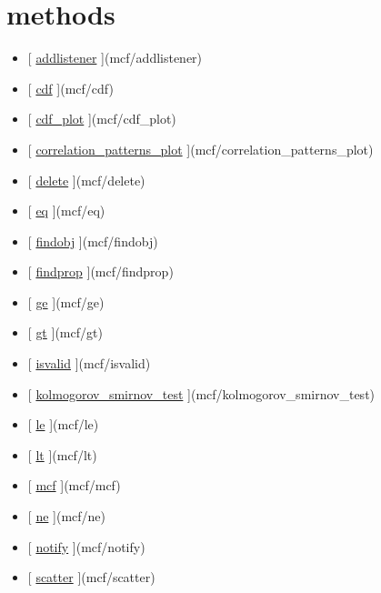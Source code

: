 \documentclass[letterpaper,10pt,english]{sphinxmanual}
\begin{document}
\section{methods}
\label{classes/utils/@mcf/mcf:methods}\begin{itemize}
\item {} 
{[} {\hyperref[classes/utils/@mcf/mcf:addlistener]{addlistener}} {]}(mcf/addlistener)

\item {} 
{[} {\hyperref[classes/utils/@mcf/mcf:cdf]{cdf}} {]}(mcf/cdf)

\item {} 
{[} {\hyperref[classes/utils/@mcf/mcf:cdf-plot]{cdf\_plot}} {]}(mcf/cdf\_plot)

\item {} 
{[} {\hyperref[classes/utils/@mcf/mcf:correlation-patterns-plot]{correlation\_patterns\_plot}} {]}(mcf/correlation\_patterns\_plot)

\item {} 
{[} {\hyperref[classes/utils/@mcf/mcf:delete]{delete}} {]}(mcf/delete)

\item {} 
{[} {\hyperref[classes/utils/@mcf/mcf:eq]{eq}} {]}(mcf/eq)

\item {} 
{[} {\hyperref[classes/utils/@mcf/mcf:findobj]{findobj}} {]}(mcf/findobj)

\item {} 
{[} {\hyperref[classes/utils/@mcf/mcf:findprop]{findprop}} {]}(mcf/findprop)

\item {} 
{[} {\hyperref[classes/utils/@mcf/mcf:ge]{ge}} {]}(mcf/ge)

\item {} 
{[} {\hyperref[classes/utils/@mcf/mcf:gt]{gt}} {]}(mcf/gt)

\item {} 
{[} {\hyperref[classes/utils/@mcf/mcf:isvalid]{isvalid}} {]}(mcf/isvalid)

\item {} 
{[} {\hyperref[classes/utils/@mcf/mcf:kolmogorov-smirnov-test]{kolmogorov\_smirnov\_test}} {]}(mcf/kolmogorov\_smirnov\_test)

\item {} 
{[} {\hyperref[classes/utils/@mcf/mcf:le]{le}} {]}(mcf/le)

\item {} 
{[} {\hyperref[classes/utils/@mcf/mcf:lt]{lt}} {]}(mcf/lt)

\item {} 
{[} {\hyperref[classes/utils/@mcf/mcf:mcf]{mcf}} {]}(mcf/mcf)

\item {} 
{[} {\hyperref[classes/utils/@mcf/mcf:ne]{ne}} {]}(mcf/ne)

\item {} 
{[} {\hyperref[classes/utils/@mcf/mcf:notify]{notify}} {]}(mcf/notify)

\item {} 
{[} {\hyperref[classes/utils/@mcf/mcf:scatter]{scatter}} {]}(mcf/scatter)

\end{itemize}
\end{document}
